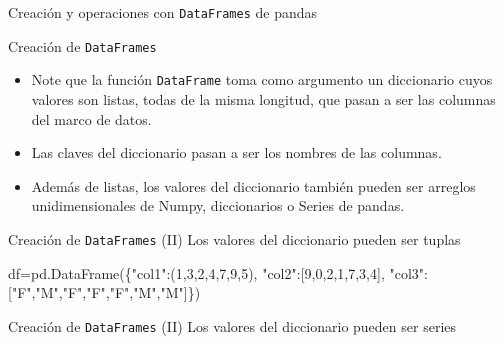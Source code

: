 \documentclass[
  ignorenonframetext,
  aspectratio=169,
  spanish,
]{beamer}
\newenvironment{Shaded}{\begin{snugshade}}{\end{snugshade}}
\newcommand{\DecValTok}[1]{\textcolor[rgb]{0.68,0.00,0.00}{#1}}
\newcommand{\NormalTok}[1]{\textcolor[rgb]{0.00,0.23,0.31}{#1}}
\newcommand{\OperatorTok}[1]{\textcolor[rgb]{0.37,0.37,0.37}{#1}}
\newcommand{\StringTok}[1]{\textcolor[rgb]{0.13,0.47,0.30}{#1}}
\begin{document}
\begin{frame}[fragile]{Creación y operaciones con \texttt{DataFrames} de
pandas}
\begin{block}{Creación de \texttt{DataFrames}}
\begin{itemize}
\item
  Note que la función \texttt{DataFrame} toma como argumento un
  diccionario cuyos valores son listas, todas de la misma longitud, que
  pasan a ser las columnas del marco de datos.
\item
  Las claves del diccionario pasan a ser los nombres de las columnas.
\item
  Además de listas, los valores del diccionario también pueden ser
  arreglos unidimensionales de Numpy, diccionarios o Series de pandas.
\end{itemize}
\end{block}

\begin{block}{Creación de \texttt{DataFrames} (II)}
\label{creaciuxf3n-de-dataframes-ii}
Los valores del diccionario pueden ser tuplas

\begin{Shaded}
\begin{Highlighting}[numbers=left,,]
\NormalTok{df}\OperatorTok{=}\NormalTok{pd.DataFrame(\{}\StringTok{"col1"}\NormalTok{:(}\DecValTok{1}\NormalTok{,}\DecValTok{3}\NormalTok{,}\DecValTok{2}\NormalTok{,}\DecValTok{4}\NormalTok{,}\DecValTok{7}\NormalTok{,}\DecValTok{9}\NormalTok{,}\DecValTok{5}\NormalTok{),}
                \StringTok{"col2"}\NormalTok{:[}\DecValTok{9}\NormalTok{,}\DecValTok{0}\NormalTok{,}\DecValTok{2}\NormalTok{,}\DecValTok{1}\NormalTok{,}\DecValTok{7}\NormalTok{,}\DecValTok{3}\NormalTok{,}\DecValTok{4}\NormalTok{],}
            \StringTok{"col3"}\NormalTok{:[}\StringTok{"F"}\NormalTok{,}\StringTok{"M"}\NormalTok{,}\StringTok{"F"}\NormalTok{,}\StringTok{"F"}\NormalTok{,}\StringTok{"F"}\NormalTok{,}\StringTok{"M"}\NormalTok{,}\StringTok{"M"}\NormalTok{]\})}
\end{Highlighting}
\end{Shaded}
\end{block}

\begin{block}{Creación de \texttt{DataFrames} (II)}
\label{creaciuxf3n-de-dataframes-ii-1}
Los valores del diccionario pueden ser series


\end{block}
\end{frame}
\end{document}
